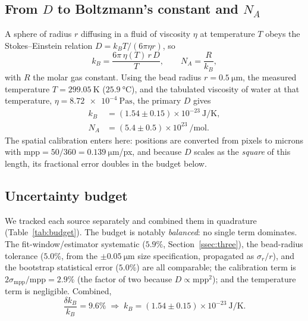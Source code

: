 \documentclass[11pt]{article}
\begin{document}
\subsection{From \texorpdfstring{$D$}{D} to Boltzmann's constant and \texorpdfstring{$N_A$}{NA}}
\label{ssec:stokes}
A sphere of radius $r$ diffusing in a fluid of viscosity $\eta$ at temperature $T$
obeys the Stokes--Einstein relation $D = k_B T/(6\pi\eta r)$, so
\begin{equation}
    k_B = \frac{6\pi\,\eta(T)\,r\,D}{T},
    \qquad
    N_A = \frac{R}{k_B},
    \label{eq:kb}
\end{equation}
with $R$ the molar gas constant. Using the bead radius $r = \SI{0.5}{\micro\meter}$,
the measured temperature $T = \SI{299.05}{\kelvin}$ ($\SI{25.9}{\celsius}$), and the
tabulated viscosity of water at that temperature, $\eta = \SI{8.72e-4}{\pascal\second}$,
the primary $D$ gives
\begin{equation}
\begin{aligned}
    k_B &= (1.54 \pm 0.15)\times10^{-23}~\si{\joule\per\kelvin},\\
    N_A &= (5.4 \pm 0.5)\times10^{23}~\si{\per\mole}.
\end{aligned}
\end{equation}
The spatial calibration enters here: positions are converted from pixels to microns
with $\text{mpp} = 50/360 = \SI{0.139}{\micro\meter}$/px, and because $D$ scales as
the \emph{square} of this length, its fractional error doubles in the budget below.

\subsection{Uncertainty budget}
\label{ssec:budget}
We tracked each source separately and combined them in quadrature
(Table~\ref{tab:budget}). The budget is notably \emph{balanced}: no single term
dominates. The fit-window/estimator systematic ($5.9\%$, Section~\ref{ssec:three}),
the bead-radius tolerance ($5.0\%$, from the $\pm\SI{0.05}{\micro\meter}$ size
specification, propagated as $\sigma_r/r$), and the bootstrap statistical error
($5.0\%$) are all comparable; the calibration term is $2\sigma_{\text{mpp}}/
\text{mpp} = 2.9\%$ (the factor of two because $D\propto\text{mpp}^2$); and the
temperature term is negligible. Combined,
\begin{equation}
    \frac{\delta k_B}{k_B} = 9.6\%
    \;\Longrightarrow\;
    k_B = (1.54\pm0.15)\times10^{-23}~\si{\joule\per\kelvin}.
\end{equation}
\end{document}
